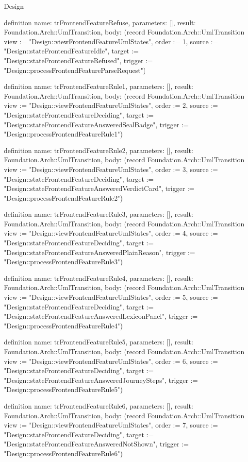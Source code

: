 \begin{lexlean}{Design}
\begin{semanticmodule}
definition{
  name: trFrontendFeatureRefuse,
  parameters: [],
  result: Foundation.Arch::UmlTransition,
  body: (record Foundation.Arch::UmlTransition {view := "Design::viewFrontendFeatureUmlStates", order := 1, source := "Design::stateFrontendFeatureIdle", target := "Design::stateFrontendFeatureRefused", trigger := "Design::processFrontendFeatureParseRequest"})
}

definition{
  name: trFrontendFeatureRule1,
  parameters: [],
  result: Foundation.Arch::UmlTransition,
  body: (record Foundation.Arch::UmlTransition {view := "Design::viewFrontendFeatureUmlStates", order := 2, source := "Design::stateFrontendFeatureDeciding", target := "Design::stateFrontendFeatureAnsweredSealBadge", trigger := "Design::processFrontendFeatureRule1"})
}

definition{
  name: trFrontendFeatureRule2,
  parameters: [],
  result: Foundation.Arch::UmlTransition,
  body: (record Foundation.Arch::UmlTransition {view := "Design::viewFrontendFeatureUmlStates", order := 3, source := "Design::stateFrontendFeatureDeciding", target := "Design::stateFrontendFeatureAnsweredVerdictCard", trigger := "Design::processFrontendFeatureRule2"})
}

definition{
  name: trFrontendFeatureRule3,
  parameters: [],
  result: Foundation.Arch::UmlTransition,
  body: (record Foundation.Arch::UmlTransition {view := "Design::viewFrontendFeatureUmlStates", order := 4, source := "Design::stateFrontendFeatureDeciding", target := "Design::stateFrontendFeatureAnsweredPlainReason", trigger := "Design::processFrontendFeatureRule3"})
}

definition{
  name: trFrontendFeatureRule4,
  parameters: [],
  result: Foundation.Arch::UmlTransition,
  body: (record Foundation.Arch::UmlTransition {view := "Design::viewFrontendFeatureUmlStates", order := 5, source := "Design::stateFrontendFeatureDeciding", target := "Design::stateFrontendFeatureAnsweredLexiconPanel", trigger := "Design::processFrontendFeatureRule4"})
}

definition{
  name: trFrontendFeatureRule5,
  parameters: [],
  result: Foundation.Arch::UmlTransition,
  body: (record Foundation.Arch::UmlTransition {view := "Design::viewFrontendFeatureUmlStates", order := 6, source := "Design::stateFrontendFeatureDeciding", target := "Design::stateFrontendFeatureAnsweredJourneySteps", trigger := "Design::processFrontendFeatureRule5"})
}

definition{
  name: trFrontendFeatureRule6,
  parameters: [],
  result: Foundation.Arch::UmlTransition,
  body: (record Foundation.Arch::UmlTransition {view := "Design::viewFrontendFeatureUmlStates", order := 7, source := "Design::stateFrontendFeatureDeciding", target := "Design::stateFrontendFeatureAnsweredNotShown", trigger := "Design::processFrontendFeatureRule6"})
}


\end{semanticmodule}
\end{lexlean}
